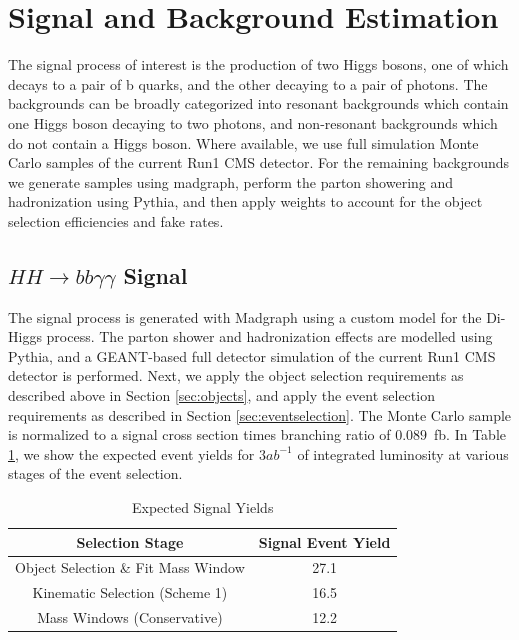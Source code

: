 \documentclass{cmspaper}
\begin{document}
\section{Signal and Background Estimation}
\label{sec:bkgestimation}
The signal process of interest is the production of two Higgs bosons, one of which decays to a pair of b quarks, 
and the other decaying to a pair of photons. 
The backgrounds can be broadly categorized into resonant backgrounds which contain one Higgs boson 
decaying to two photons, and non-resonant backgrounds which do not contain a Higgs boson. 
Where available, we use full simulation Monte Carlo samples of the current Run1 CMS detector.
For the remaining backgrounds we generate samples using madgraph, perform the parton showering and
hadronization using Pythia, and then apply weights to account for the object selection efficiencies
and fake rates.

\subsection{$HH \rightarrow bb\gamma\gamma$ Signal}
The signal process is generated with Madgraph using a custom model for the Di-Higgs process. The parton
shower and hadronization effects are modelled using Pythia, and a GEANT-based full detector simulation 
of the current Run1 CMS detector is performed. Next, we apply the object selection requirements as 
described above in Section \ref{sec:objects}, and apply the event selection requirements as described 
in Section \ref{sec:eventselection}. The Monte Carlo sample is normalized to a signal cross section
times branching ratio of $0.089$~fb. In Table \ref{tab:signalEventYields}, we show the 
expected event yields for $3 ab^{-1}$ of integrated luminosity at various stages of the event
selection.


\begin{table}[!ht]
\begin{center} 
\begin{tabular}{|c|c|}
\hline
Selection Stage                     &  Signal Event Yield    \\  \hline
Object Selection \& Fit Mass Window &  27.1                  \\ 
Kinematic Selection (Scheme 1)      &  16.5                  \\ 
Mass Windows (Conservative)         &  12.2                  \\ \hline

\end{tabular}
\caption{Expected Signal Yields }
\label{tab:signalEventYields}
\end{center}
\end{table}
\end{document}
